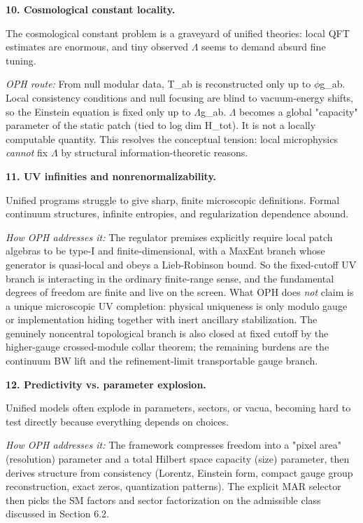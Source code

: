 \textbf{10. Cosmological constant locality.}

The cosmological constant problem is a graveyard of unified theories: local QFT estimates are enormous, and tiny observed \ensuremath{\Lambda} seems to demand absurd fine tuning.

\emph{OPH route:} From null modular data, T\_ab is reconstructed only up to \ensuremath{\phi}g\_ab. Local consistency conditions and null focusing are blind to vacuum-energy shifts, so the Einstein equation is fixed only up to \ensuremath{\Lambda}g\_ab. \ensuremath{\Lambda} becomes a global "capacity" parameter of the static patch (tied to log dim H\_tot). It is not a locally computable quantity. This resolves the conceptual tension: local microphysics \emph{cannot} fix \ensuremath{\Lambda} by structural information-theoretic reasons.

\textbf{11. UV infinities and nonrenormalizability.}

Unified programs struggle to give sharp, finite microscopic definitions. Formal continuum structures, infinite entropies, and regularization dependence abound.

\emph{How OPH addresses it:} The regulator premises explicitly require local patch algebras to be type-I and finite-dimensional, with a MaxEnt branch whose generator is quasi-local and obeys a Lieb-Robinson bound. So the fixed-cutoff UV branch is interacting in the ordinary finite-range sense, and the fundamental degrees of freedom are finite and live on the screen. What OPH does \emph{not} claim is a unique microscopic UV completion: physical uniqueness is only modulo gauge or implementation hiding together with inert ancillary stabilization. The genuinely noncentral topological branch is also closed at fixed cutoff by the higher-gauge crossed-module collar theorem; the remaining burdens are the continuum BW lift and the refinement-limit transportable gauge branch.

\textbf{12. Predictivity vs. parameter explosion.}

Unified models often explode in parameters, sectors, or vacua, becoming hard to test directly because everything depends on choices.

\emph{How OPH addresses it:} The framework compresses freedom into a "pixel area" (resolution) parameter and a total Hilbert space capacity (size) parameter, then derives structure from consistency (Lorentz, Einstein form, compact gauge group reconstruction, exact zeros, quantization patterns). The explicit MAR selector then picks the SM factors and sector factorization on the admissible class discussed in Section 6.2.

